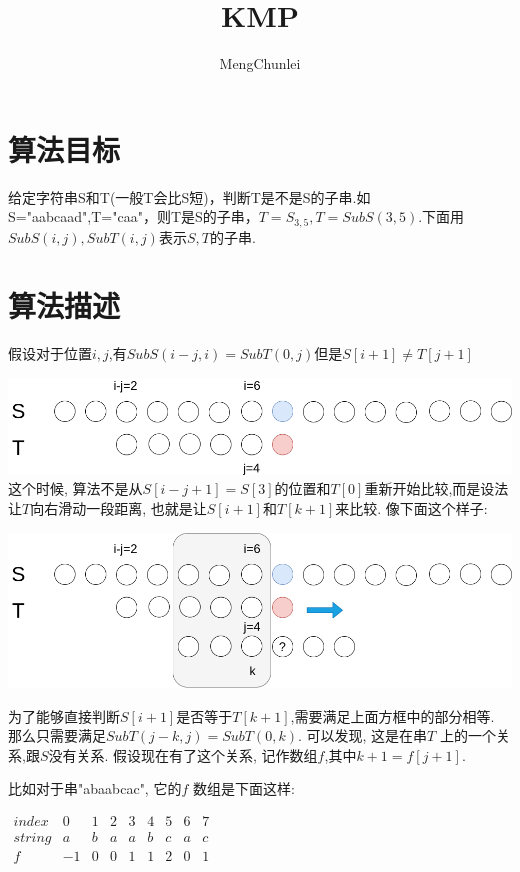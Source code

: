 \documentclass{article}
\title{KMP}
\author{MengChunlei}
\begin{document}
\maketitle
\section{算法目标}
给定字符串S和T(一般T会比S短)，判断T是不是S的子串.如S="aabcaad",T="caa"，则T是S的子串，$T=S_{3,5},T=SubS(3,5)$.下面用$SubS(i,j),SubT(i,j)$表示$S,T$的子串. \par
\section{算法描述}
假设对于位置$i,j$,有$SubS(i-j,i)=SubT(0,j)$但是$S[i+1]\neq T[j+1]$\par
\includegraphics[scale=0.35]{pic1.png}
这个时候, 算法不是从$S[i-j+1]=S[3]$的位置和$T[0]$重新开始比较,而是设法让$T$向右滑动一段距离, 也就是让$S[i+1]$和$T[k+1]$来比较. 像下面这个样子: \par
\includegraphics[scale=0.35]{pic2.png} \par
为了能够直接判断$S[i+1]$是否等于$T[k+1]$,需要满足上面方框中的部分相等. 那么只需要满足$SubT(j-k,j)=SubT(0,k)$. 可以发现, 这是在串$T$ 上的一个关系,跟$S$没有关系. 假设现在有了这个关系, 记作数组$f$,其中$k+1=f[j+1]$.  \par

比如对于串"abaabcac", 它的$f$ 数组是下面这样: \par

$\begin{matrix} 
index & 0 & 1 & 2 & 3 & 4 & 5 & 6 & 7 \\ 
string & a & b & a & a & b & c & a & c \\ 
f & -1 & 0 & 0 & 1 & 1 & 2 & 0 & 1 \\
\end{matrix}$
\end{document}
